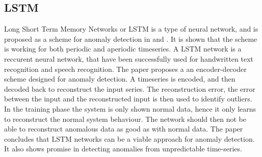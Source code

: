     
    \subsection{LSTM}
    
    Long Short Term Memory Networks or LSTM is a type of neural network, and is proposed as a scheme for anomaly detection in \cite{Malhotra2016} and \cite{Malhotra}. It is shown that the scheme is working for both periodic and aperiodic timeseries. 
    A LSTM network is a reccurent neural network, that have been successfully used for handwritten text recognition and speech recognition. The paper proposes a an encoder-decoder scheme designed for anomaly detection. A timeseries is encoded, and then decoded back to reconstruct the input series. The reconstruction error, the error between the input and the reconstructed input is then used to identify outliers. In the training phase the system is only shown normal data, hence it only learns to reconstruct the normal system behaviour. The network should then not be able to reconstruct anomalous data as good as with normal data. The paper concludes that LSTM networks can be a viable approach for anomaly detection. It also shows promise in detecting anomalies from unpredictable time-series.      
    
